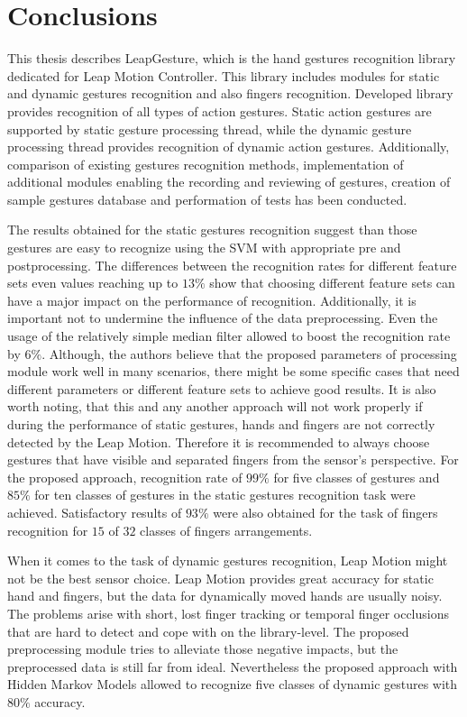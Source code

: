 \chapter{Conclusions}\label{conclusionsChapter}

This thesis describes LeapGesture, which is the hand gestures recognition library dedicated for Leap Motion Controller.
This library includes modules for static and dynamic gestures recognition and also fingers recognition.
Developed library provides recognition of all types of action gestures.
Static action gestures are supported by static gesture processing thread, while the dynamic gesture processing thread provides recognition of dynamic action gestures.
Additionally, comparison of existing gestures recognition methods, implementation of additional modules enabling the recording and reviewing of gestures, creation of sample gestures database and performation of tests has been conducted.

The results obtained for the static gestures recognition suggest than those gestures are easy to recognize using the SVM with appropriate pre and postprocessing.
The differences between the recognition rates for different feature sets even values reaching up to $13\%$ show that choosing different feature sets can have a major impact on the performance of recognition.
Additionally, it is important not to undermine the influence of the data preprocessing. 
Even the usage of the relatively simple median filter allowed to boost the recognition rate by $6\%$.
Although, the authors believe that the proposed parameters of processing module work well in many scenarios, there might be some specific cases that need different parameters or different feature sets to achieve good results.
It is also worth noting, that this and any another approach will not work properly if during the performance of static gestures, hands and fingers are not correctly detected by the Leap Motion.
Therefore it is recommended to always choose gestures that have visible and separated fingers from the sensor's perspective.
For the proposed approach, recognition rate of $99\%$ for five classes of gestures and $85\%$ for ten classes of gestures in the static gestures recognition task were achieved. Satisfactory results of $93\%$ were also obtained for the task of fingers recognition for $15$ of $32$ classes of fingers arrangements.

When it comes to the task of dynamic gestures recognition, Leap Motion might not be the best sensor choice.
Leap Motion provides great accuracy for static hand and fingers, but the data for dynamically moved hands are usually noisy.
The problems arise with short, lost finger tracking or temporal finger occlusions that are hard to detect and cope with on the library-level.
The proposed preprocessing module tries to alleviate those negative impacts, but the preprocessed data is still far from ideal.
Nevertheless the proposed approach with Hidden Markov Models allowed to recognize five classes of dynamic gestures with $80\%$ accuracy.

